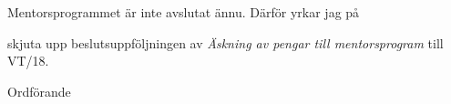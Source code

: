 \documentclass[../_main/handlingar.tex]{subfiles}
\begin{document}

Mentorsprogrammet är inte avslutat ännu. Därför yrkar jag på
\begin{attsatser}
    \att skjuta upp beslutsuppföljningen av \emph{Äskning av pengar till mentorsprogram} till VT/18.
\end{attsatser}

\begin{signatures}{1}
    \mvh
	\signature{\ordf}{Ordförande}
\end{signatures}
\end{document}
